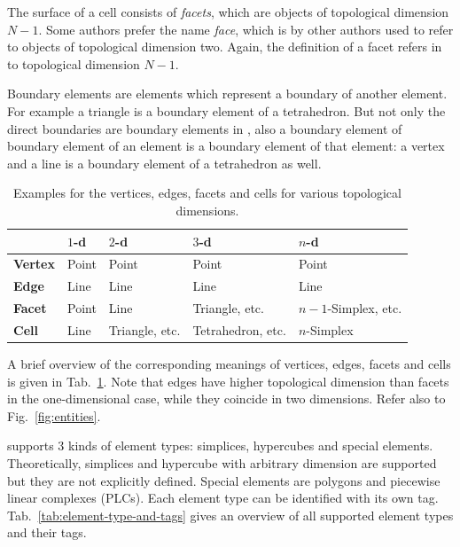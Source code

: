 The surface of a cell consists of \emph{facets}, which are objects of topological dimension $N-1$. Some authors prefer the name \emph{face}, which is by other authors used to refer to objects of topological dimension two. Again, the definition of a facet refers in {\ViennaGrid} to topological dimension $N-1$.

Boundary elements are elements which represent a boundary of another element. For example a triangle is a boundary element of a tetrahedron. But not only the direct boundaries are boundary elements in {\ViennaGrid}, also a boundary element of boundary element of an element is a boundary element of that element: a vertex and a line is a boundary element of a tetrahedron as well.

\begin{table}[b]
 \centering
 \renewcommand{\arraystretch}{1.3}
\begin{tabular}{|l|l|l|l|l|}
\hline
          &  $1$-d & $2$-d & $3$-d & $n$-d \\
\hline
 \textbf{Vertex}   & Point  & Point & Point & Point \\
 \textbf{Edge}     & Line   & Line  & Line  & Line \\
 \textbf{Facet}   & Point  & Line  & Triangle, etc. & $n-1$-Simplex, etc. \\
 \textbf{Cell}   & Line   & Triangle, etc. & Tetrahedron, etc. & $n$-Simplex \\
\hline
\end{tabular}
\caption{Examples for the vertices, edges, facets and cells for various topological dimensions.}
\label{tab:vertex-edge-facet-cell}
\end{table}

A brief overview of the corresponding meanings of vertices, edges, facets and cells is given in Tab.~\ref{tab:vertex-edge-facet-cell}. Note that edges have higher topological dimension than facets in the one-dimensional case, while they coincide in two dimensions. Refer also to Fig.~\ref{fig:entities}.

{\ViennaGrid} supports 3 kinds of element types: simplices, hypercubes and special elements. Theoretically, simplices and hypercube with arbitrary dimension are supported but they are not explicitly defined. Special elements are polygons and piecewise linear complexes (PLCs). Each element type can be identified with its own tag. Tab.~\ref{tab:element-type-and-tags} gives an overview of all supported element types and their tags.

